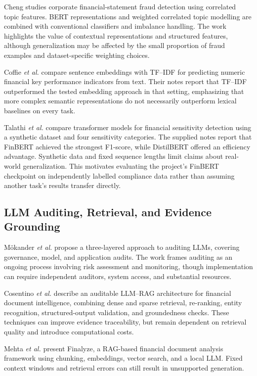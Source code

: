 \documentclass[conference]{IEEEtran}
\begin{document}
Cheng \cite{cheng2024} studies corporate financial-statement fraud detection using correlated topic features. BERT representations and weighted correlated topic modelling are combined with conventional classifiers and imbalance handling. The work highlights the value of contextual representations and structured features, although generalization may be affected by the small proportion of fraud examples and dataset-specific weighting choices.

Coffie \emph{et al.} \cite{coffie2025} compare sentence embeddings with TF--IDF for predicting numeric financial key performance indicators from text. Their notes report that TF--IDF outperformed the tested embedding approach in that setting, emphasizing that more complex semantic representations do not necessarily outperform lexical baselines on every task.

Talathi \emph{et al.} \cite{talathi2026} compare transformer models for financial sensitivity detection using a synthetic dataset and four sensitivity categories. The supplied notes report that FinBERT achieved the strongest F1-score, while DistilBERT offered an efficiency advantage. Synthetic data and fixed sequence lengths limit claims about real-world generalization. This motivates evaluating the project's FinBERT checkpoint on independently labelled compliance data rather than assuming another task's results transfer directly.

\subsection{LLM Auditing, Retrieval, and Evidence Grounding}
Mökander \emph{et al.} \cite{mokander2023} propose a three-layered approach to auditing LLMs, covering governance, model, and application audits. The work frames auditing as an ongoing process involving risk assessment and monitoring, though implementation can require independent auditors, system access, and substantial resources.

Cosentino \emph{et al.} \cite{cosentino2026} describe an auditable LLM--RAG architecture for financial document intelligence, combining dense and sparse retrieval, re-ranking, entity recognition, structured-output validation, and groundedness checks. These techniques can improve evidence traceability, but remain dependent on retrieval quality and introduce computational costs.

Mehta \emph{et al.} \cite{mehta2025} present Finalyze, a RAG-based financial document analysis framework using chunking, embeddings, vector search, and a local LLM. Fixed context windows and retrieval errors can still result in unsupported generation.
\end{document}
